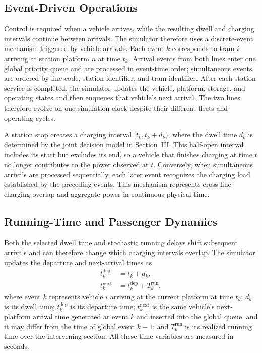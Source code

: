 \documentclass[conference]{IEEEtran}
\begin{document}
\subsection{Event-Driven Operations}
Control is required when a vehicle arrives, while the resulting dwell and charging intervals continue between arrivals. The simulator therefore uses a discrete-event mechanism triggered by vehicle arrivals. Each event $k$ corresponds to tram $i$ arriving at station platform $n$ at time $t_k$. Arrival events from both lines enter one global priority queue and are processed in event-time order; simultaneous events are ordered by line code, station identifier, and tram identifier. After each station service is completed, the simulator updates the vehicle, platform, storage, and operating states and then enqueues that vehicle's next arrival. The two lines therefore evolve on one simulation clock despite their different fleets and operating cycles.

A station stop creates a charging interval $[t_k,t_k+d_k)$, where the dwell time $d_k$ is determined by the joint decision model in Section~III. This half-open interval includes its start but excludes its end, so a vehicle that finishes charging at time $t$ no longer contributes to the power observed at $t$. Conversely, when simultaneous arrivals are processed sequentially, each later event recognizes the charging load established by the preceding events. This mechanism represents cross-line charging overlap and aggregate power in continuous physical time.

\subsection{Running-Time and Passenger Dynamics}
Both the selected dwell time and stochastic running delays shift subsequent arrivals and can therefore change which charging intervals overlap. The simulator updates the departure and next-arrival times as
\begin{align}
    t^{\mathrm{dep}}_k &= t_k + d_k, \\
    t^{\mathrm{next}}_k &= t^{\mathrm{dep}}_k + T^{\mathrm{run}}_{k},
\end{align}
where event $k$ represents vehicle $i$ arriving at the current platform at time $t_k$; $d_k$ is its dwell time; $t^{\mathrm{dep}}_k$ is its departure time; $t^{\mathrm{next}}_k$ is the same vehicle's next-platform arrival time generated at event $k$ and inserted into the global queue, and it may differ from the time of global event $k+1$; and $T^{\mathrm{run}}_k$ is its realized running time over the intervening section. All these time variables are measured in seconds.
\end{document}
